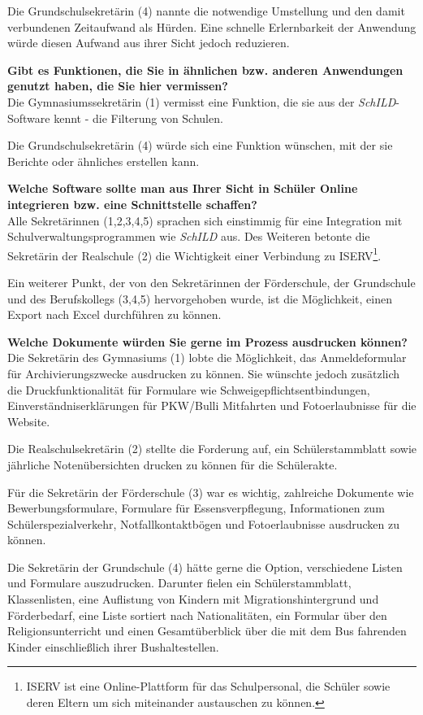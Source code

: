 Die Grundschulsekretärin (4) nannte die notwendige Umstellung und den damit verbundenen Zeitaufwand als Hürden. Eine schnelle Erlernbarkeit der Anwendung würde diesen Aufwand aus ihrer Sicht jedoch reduzieren.

\textbf{Gibt es Funktionen, die Sie in ähnlichen bzw. anderen Anwendungen genutzt haben, die Sie hier vermissen?}\\
Die Gymnasiumssekretärin (1) vermisst eine Funktion, die sie aus der \textit{SchILD}-Software kennt - die Filterung von Schulen.

Die Grundschulsekretärin (4) würde sich eine Funktion wünschen, mit der sie Berichte oder ähnliches erstellen kann.

\textbf{Welche Software sollte man aus Ihrer Sicht in Schüler Online integrieren bzw. eine Schnittstelle schaffen?}\\
Alle Sekretärinnen (1,2,3,4,5) sprachen sich einstimmig für eine Integration mit Schulverwaltungsprogrammen wie \textit{SchILD} aus. Des Weiteren betonte die Sekretärin der Realschule (2) die Wichtigkeit einer Verbindung zu ISERV\footnote{ISERV ist eine Online-Plattform für das Schulpersonal, die Schüler sowie deren Eltern um sich miteinander austauschen zu können.}.

Ein weiterer Punkt, der von den Sekretärinnen der Förderschule, der Grundschule und des Berufskollegs (3,4,5) hervorgehoben wurde, ist die Möglichkeit, einen Export nach Excel durchführen zu können.

\textbf{Welche Dokumente würden Sie gerne im Prozess ausdrucken können?}\\
Die Sekretärin des Gymnasiums (1) lobte die Möglichkeit, das Anmeldeformular für Archivierungszwecke ausdrucken zu können. Sie wünschte jedoch zusätzlich die Druckfunktionalität für Formulare wie Schweigepflichtsentbindungen, Einverständniserklärungen für PKW/Bulli Mitfahrten und Fotoerlaubnisse für die Website.

Die Realschulsekretärin (2) stellte die Forderung auf, ein Schülerstammblatt sowie jährliche Notenübersichten drucken zu können für die Schülerakte.

Für die Sekretärin der Förderschule (3) war es wichtig, zahlreiche Dokumente wie Bewerbungsformulare, Formulare für Essensverpflegung, Informationen zum Schülerspezialverkehr, Notfallkontaktbögen und Fotoerlaubnisse ausdrucken zu können.

Die Sekretärin der Grundschule (4) hätte gerne die Option, verschiedene Listen und Formulare auszudrucken. Darunter fielen ein Schülerstammblatt, Klassenlisten, eine Auflistung von Kindern mit Migrationshintergrund und Förderbedarf, eine Liste sortiert nach Nationalitäten, ein Formular über den Religionsunterricht und einen Gesamtüberblick über die mit dem Bus fahrenden Kinder einschließlich ihrer Bushaltestellen.

